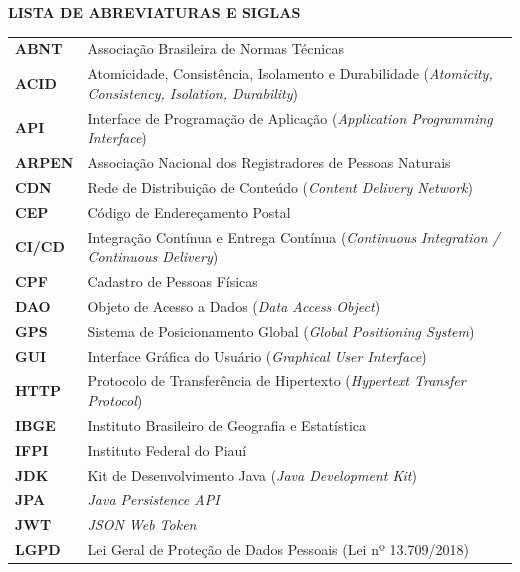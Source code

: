 \newpage
\begin{center}
    \textbf{LISTA DE ABREVIATURAS E SIGLAS}
\end{center}
\thispagestyle{empty} %

\noindent
{\singlespacing
\begin{tabular}{@{}p{2.0cm}p{13.5cm}@{}}
    \textbf{ABNT}      & Associação Brasileira de Normas Técnicas \\
    \textbf{ACID}      & Atomicidade, Consistência, Isolamento e Durabilidade (\textit{Atomicity, Consistency, Isolation, Durability}) \\
    \textbf{API}       & Interface de Programação de Aplicação (\textit{Application Programming Interface}) \\
    \textbf{ARPEN}     & Associação Nacional dos Registradores de Pessoas Naturais \\
    \textbf{CDN}       & Rede de Distribuição de Conteúdo (\textit{Content Delivery Network}) \\
    \textbf{CEP}       & Código de Endereçamento Postal \\
    \textbf{CI/CD}     & Integração Contínua e Entrega Contínua (\textit{Continuous Integration / Continuous Delivery}) \\
    \textbf{CPF}       & Cadastro de Pessoas Físicas \\
    \textbf{DAO}       & Objeto de Acesso a Dados (\textit{Data Access Object}) \\
    \textbf{GPS}       & Sistema de Posicionamento Global (\textit{Global Positioning System}) \\
    \textbf{GUI}       & Interface Gráfica do Usuário (\textit{Graphical User Interface}) \\
    \textbf{HTTP}      & Protocolo de Transferência de Hipertexto (\textit{Hypertext Transfer Protocol}) \\
    \textbf{IBGE}      & Instituto Brasileiro de Geografia e Estatística \\
    \textbf{IFPI}      & Instituto Federal do Piauí \\
    \textbf{JDK}       & Kit de Desenvolvimento Java (\textit{Java Development Kit}) \\
    \textbf{JPA}       & \textit{Java Persistence API} \\
    \textbf{JWT}       & \textit{JSON Web Token} \\
    \textbf{LGPD}      & Lei Geral de Proteção de Dados Pessoais (Lei nº 13.709/2018) \\

\end{tabular}}

